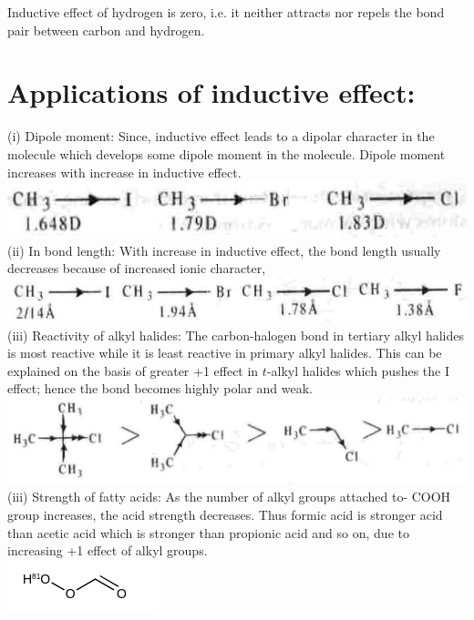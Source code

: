 \documentclass[10pt]{article}
\begin{document}
Inductive effect of hydrogen is zero, i.e. it neither attracts nor repels the bond pair between carbon and hydrogen.

\section*{Applications of inductive effect:}
(i) Dipole moment: Since, inductive effect leads to a dipolar character in the molecule which develops some dipole moment in the molecule. Dipole moment increases with increase in inductive effect.\\
\includegraphics[max width=\textwidth, center]{2025_01_28_8470952b98110cec3aabg-067(3)}\\
(ii) In bond length: With increase in inductive effect, the bond length usually decreases because of increased ionic character,\\
\includegraphics[max width=\textwidth, center]{2025_01_28_8470952b98110cec3aabg-067}\\
(iii) Reactivity of alkyl halides: The carbon-halogen bond in tertiary alkyl halides is most reactive while it is least reactive in primary alkyl halides. This can be explained on the basis of greater +1 effect in $t$-alkyl halides which pushes the I effect; hence the bond becomes highly polar and weak.\\
\includegraphics[max width=\textwidth, center]{2025_01_28_8470952b98110cec3aabg-067(1)}\\
(iii) Strength of fatty acids: As the number of alkyl groups attached to- COOH group increases, the acid strength decreases. Thus formic acid is stronger acid than acetic acid which is stronger than propionic acid and so on, due to increasing +1 effect of alkyl groups.\\
\includegraphics{smile-98e044856c3899dd2c953ad837b1acb41a5efca5}
\end{document}
